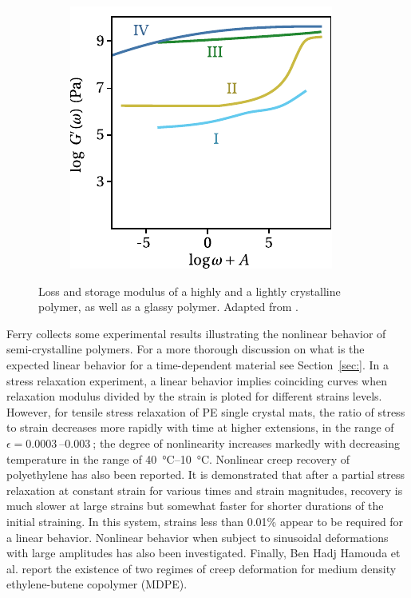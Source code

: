 \begin{figure}
\begin{subfigure}[b]{0.45\textwidth}
						\includegraphics[width=\textwidth]{figures/storage_modulus_scp}
						\caption{}
						\label{subfig:storage_modulus_scp}
		\end{subfigure}
	\caption{Loss  and storage  modulus of a highly and a lightly crystalline polymer, as well as a glassy polymer. Adapted from \cite{ferryViscoelasticPropertiesPolymers1980}.}
\label{fig:dma_scp}
\end{figure}

Ferry \citep{ferryViscoelasticPropertiesPolymers1980} collects some experimental results illustrating the nonlinear behavior of semi-crystalline polymers.
For a more thorough discussion on what is the expected linear behavior for a time-dependent material see Section~\ref{sec:}.
In a stress relaxation experiment, a linear behavior implies coinciding curves when relaxation modulus divided by the strain is ploted for different strains levels.
However, for tensile stress relaxation of PE single crystal mats, the ratio of stress to strain decreases more rapidly with time at higher extensions, in the range of $\epsilon = \SIrange{0.0003}{0.003}{}$; the degree of nonlinearity increases markedly with decreasing temperature in the range of \SIrange{40}{10}{\celsius}.
Nonlinear creep recovery of polyethylene has also been reported.
It is demonstrated that after a partial stress relaxation at constant strain for various times and strain magnitudes, recovery is much slower at large strains but somewhat faster for shorter durations of the initial straining.
In this system, strains less than 0.01\% appear to be required for a linear behavior.
Nonlinear behavior when subject to sinusoidal deformations with large amplitudes has also been investigated.
Finally, Ben Hadj Hamouda et al. \citep{benhadjhamoudaViscoplasticBehaviourMedium2007} report the existence of two regimes of creep deformation for medium density ethylene-butene copolymer (MDPE).

